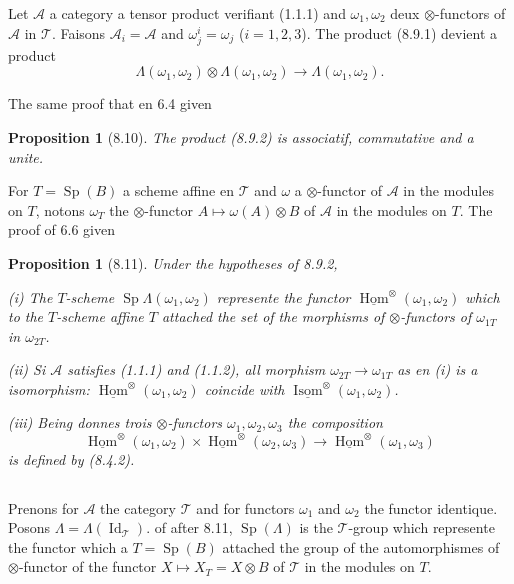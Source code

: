 \documentclass[12pt,a4paper]{article}
\theoremstyle{plain}
\newtheorem{proposition}[theorem]{Proposition}
\theoremstyle{definition}
\DeclareMathOperator{\Sp}{Sp}
\DeclareMathOperator{\Hom}{Hom}
\DeclareMathOperator{\Isom}{Isom}
\DeclareMathOperator{\Id}{Id}
\begin{document}
Let $\mathcal{A}$ a category a tensor product verifiant (1.1.1) and $\omega_1, \omega_2$ deux $\otimes$-functors of $\mathcal{A}$ in $\mathcal{T}$. Faisons $\mathcal{A}_i = \mathcal{A}$ and $\omega_j^i = \omega_j$ ($i = 1, 2, 3$). The product (8.9.1) devient a product
\begin{equation}\label{eq:8.9.2}
\Lambda(\omega_1, \omega_2) \otimes \Lambda(\omega_1, \omega_2) \to \Lambda(\omega_1, \omega_2).
\end{equation}

The same proof that en 6.4 given
\begin{proposition}[8.10]
The product (8.9.2) is associatif, commutative and a unite.
\end{proposition}

For $T = \Sp(B)$ a scheme affine en $\mathcal{T}$ and $\omega$ a $\otimes$-functor of $\mathcal{A}$ in the modules on $T$, notons $\omega_T$ the $\otimes$-functor $A \mapsto \omega(A) \otimes B$ of $\mathcal{A}$ in the modules on $T$.
The proof of 6.6 given
\begin{proposition}[8.11]
Under the hypotheses of 8.9.2,

\textup{(i)} The $T$-scheme $\Sp \Lambda(\omega_1, \omega_2)$ represente the functor $\underline{\Hom}^\otimes(\omega_1, \omega_2)$ which to the $T$-scheme affine $T$ attached the set of the morphisms of $\otimes$-functors of $\omega_{1T}$ in $\omega_{2T}$.

\textup{(ii)} Si $\mathcal{A}$ satisfies (1.1.1) and (1.1.2), all morphism $\omega_{2T} \to \omega_{1T}$ as en (i) is a isomorphism: $\underline{\Hom}^\otimes(\omega_1, \omega_2)$ coincide with $\underline{\Isom}^\otimes(\omega_1, \omega_2)$.

\textup{(iii)} Being donnes trois $\otimes$-functors $\omega_1, \omega_2, \omega_3$ the composition
\[
\underline{\Hom}^\otimes(\omega_1, \omega_2) \times \underline{\Hom}^\otimes(\omega_2, \omega_3) \to \underline{\Hom}^\otimes(\omega_1, \omega_3)
\]
is defined by (8.4.2).
\end{proposition}

\subsection{}

Prenons for $\mathcal{A}$ the category $\mathcal{T}$ and for functors $\omega_1$ and $\omega_2$ the functor identique. Posons $\Lambda = \Lambda(\Id_\mathcal{T})$. of after 8.11, $\Sp(\Lambda)$ is the $\mathcal{T}$-group which represente the functor which a $T = \Sp(B)$ attached the group of the automorphismes of $\otimes$-functor of the functor $X \mapsto X_T = X \otimes B$ of $\mathcal{T}$ in the modules on $T$.
\end{document}
